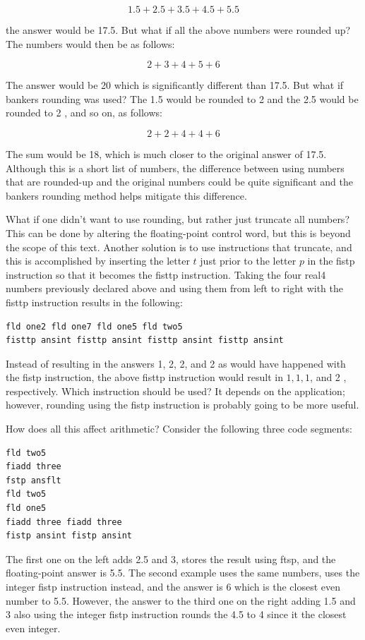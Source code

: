 \documentclass[10pt]{book}
\begin{document}
$$
1.5+2.5+3.5+4.5+5.5
$$

the answer would be 17.5. But what if all the above numbers were rounded up? The numbers would then be as follows:

$$
2+3+4+5+6
$$

The answer would be 20 which is significantly different than 17.5. But what if bankers rounding was used? The 1.5 would be rounded to 2 and the 2.5 would be rounded to 2 , and so on, as follows:

$$
2+2+4+4+6
$$

The sum would be 18, which is much closer to the original answer of 17.5. Although this is a short list of numbers, the difference between using numbers that are rounded-up and the original numbers could be quite significant and the bankers rounding method helps mitigate this difference.

What if one didn't want to use rounding, but rather just truncate all numbers? This can be done by altering the floating-point control word, but this is beyond the scope of this text. Another solution is to use instructions that truncate, and this is accomplished by inserting the letter $t$ just prior to the letter $p$ in the fistp instruction so that it becomes the fisttp instruction. Taking the four real4 numbers previously declared above and using them from left to right with the fisttp instruction results in the following:


\begin{verbatim}
fld one2 fld one7 fld one5 fld two5
fisttp ansint fisttp ansint fisttp ansint fisttp ansint
\end{verbatim}

Instead of resulting in the answers 1, 2, 2, and 2 as would have happened with the fistp instruction, the above fisttp instruction would result in $1,1,1$, and 2 , respectively. Which instruction should be used? It depends on the application; however, rounding using the fistp instruction is probably going to be more useful.

How does all this affect arithmetic? Consider the following three code segments:

\begin{verbatim}
fld two5
fiadd three
fstp ansflt
fld two5
fld one5
fiadd three fiadd three
fistp ansint fistp ansint
\end{verbatim}

The first one on the left adds 2.5 and 3, stores the result using ftsp, and the floating-point answer is 5.5. The second example uses the same numbers, uses the integer fistp instruction instead, and the answer is 6 which is the closest even number to 5.5. However, the answer to the third one on the right adding 1.5 and 3 also using the integer fistp instruction rounds the 4.5 to 4 since it the closest even integer.
\end{document}
